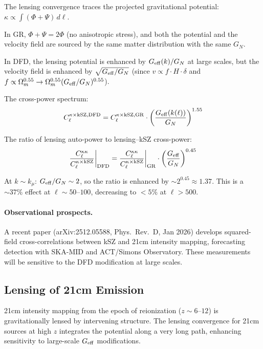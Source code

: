 \documentclass[11pt,a4paper]{article}
\newcommand{\Geff}{G_{\rm eff}}
\newcommand{\kmu}{k_\mu}
\begin{document}
The lensing convergence traces the projected gravitational potential:
$\kappa \propto \int (\Phi + \Psi)\,d\ell$.

In GR, $\Phi + \Psi = 2\Phi$ (no anisotropic stress), and both
the potential and the velocity field are sourced by the same matter
distribution with the same $G_N$.

In DFD, the lensing potential is enhanced by $\Geff(k)/G_N$ at
large scales, but the velocity field is enhanced by $\sqrt{\Geff/G_N}$
(since $v \propto f \cdot H \cdot \delta$ and $f \propto \Omega_m^{0.55}
\to \Omega_m^{0.55} (\Geff/G_N)^{0.55}$).

The cross-power spectrum:
\begin{equation}
C_\ell^{\kappa \times {\rm kSZ}, \rm DFD}
= C_\ell^{\kappa \times {\rm kSZ}, \rm GR} \cdot
\left(\frac{\Geff(k(\ell))}{G_N}\right)^{1.55}
\end{equation}

The ratio of lensing auto-power to lensing--kSZ cross-power:
\begin{equation}
\frac{C_\ell^{\kappa\kappa}}{C_\ell^{\kappa \times {\rm kSZ}}}
\bigg|_{\rm DFD}
= \frac{C_\ell^{\kappa\kappa}}{C_\ell^{\kappa \times {\rm kSZ}}}
\bigg|_{\rm GR} \cdot \left(\frac{\Geff}{G_N}\right)^{0.45}
\end{equation}

At $k \sim \kmu$: $\Geff/G_N \sim 2$, so the ratio is enhanced by
$\sim 2^{0.45} \approx 1.37$.  This is a $\sim 37\%$ effect at
$\ell \sim 50$--$100$, decreasing to $< 5\%$ at $\ell > 500$.

\paragraph{Observational prospects.}
A recent paper (arXiv:2512.05588, Phys.\ Rev.\ D, Jan 2026) develops
squared-field cross-correlations between kSZ and 21cm intensity mapping,
forecasting detection with SKA-MID and ACT/Simons Observatory.  These
measurements will be sensitive to the DFD modification at large scales.

\subsection{Lensing of 21cm Emission}

21cm intensity mapping from the epoch of reionization ($z \sim 6$--$12$)
is gravitationally lensed by intervening structure.  The lensing
convergence for 21cm sources at high $z$ integrates the potential
along a very long path, enhancing sensitivity to large-scale $\Geff$
modifications.
\end{document}

